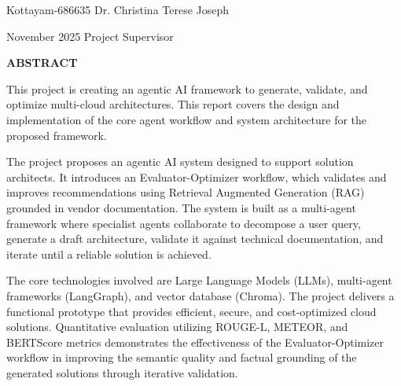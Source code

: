 \documentclass[12pt,a4wide]{report}
\theoremstyle{plain}
\theoremstyle{definition}
\theoremstyle{remark}
\begin{document}
\vspace{4cm}

\noindent Kottayam-686635  \hfill Dr. Christina Terese Joseph

\noindent November 2025 \hfill Project Supervisor

\clearpage






\begin{center}
{\Large{\bf{ABSTRACT}}}
\end{center}


This project is creating an agentic AI framework to generate, validate, and optimize multi-cloud architectures. This report covers the design and implementation of the core agent workflow and system architecture for the proposed framework.

The project proposes an agentic AI system designed to support solution architects. It introduces an Evaluator-Optimizer workflow, which validates and improves recommendations using Retrieval Augmented Generation (RAG) grounded in vendor documentation. The system is built as a multi-agent framework where specialist agents collaborate to decompose a user query, generate a draft architecture, validate it against technical documentation, and iterate until a reliable solution is achieved.

The core technologies involved are Large Language Models (LLMs), multi-agent frameworks (LangGraph), and vector database (Chroma). The project delivers a functional prototype that provides efficient, secure, and cost-optimized cloud solutions. Quantitative evaluation utilizing ROUGE-L, METEOR, and BERTScore metrics demonstrates the effectiveness of the Evaluator-Optimizer workflow in improving the semantic quality and factual grounding of the generated solutions through iterative validation.

\clearpage



\tableofcontents
\clearpage
\listoffigures
\listoftables


\newpage

\setcounter{page}{1}














\nocite{golub} \nocite{gerla}\nocite{m1}\nocite{chang}


\end{document}
